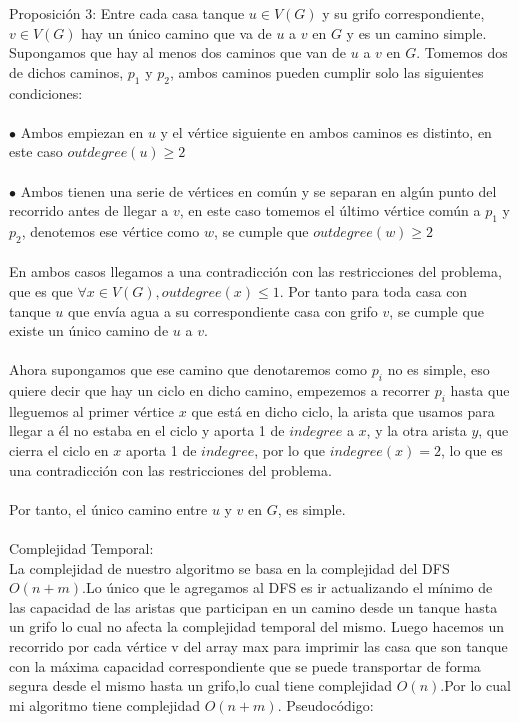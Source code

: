 \documentclass{article}
\begin{document}
    Proposici\'on 3: Entre cada casa tanque $u \in V(G)$ y su grifo correspondiente, $v \in V(G)$ hay un \'unico camino
    que va de $u$ a $v$ en $G$ y es un camino simple.\\

    Supongamos que hay al menos dos caminos que van de $u$ a $v$ en $G$. Tomemos dos de dichos caminos, $p_1$ y $p_2$, ambos caminos pueden cumplir solo las 
    siguientes condiciones:\\\\

    $\bullet$ Ambos empiezan en $u$ y el v\'ertice siguiente en ambos caminos es distinto, en este caso $outdegree(u) \geq 2$\\\\
    $\bullet$ Ambos tienen una serie de v\'ertices en com\'un y se separan en alg\'un punto del recorrido antes de llegar a $v$, 
    en este caso tomemos el \'ultimo v\'ertice com\'un a $p_1$ y $p_2$, denotemos ese v\'ertice como $w$, se cumple que $outdegree(w) \geq 2$\\\\

    En ambos casos llegamos a una contradicci\'on con las restricciones del problema, que es que $\forall x \in V(G), outdegree(x) \leq 1$. 
    Por tanto para toda casa con tanque $u$ que env\'ia agua a su correspondiente casa con grifo $v$, se cumple que existe un \'unico camino de $u$ a $v$.\\\\

    Ahora supongamos que ese camino que denotaremos como $p_i$ no es simple, eso quiere decir que hay un ciclo en dicho camino, empezemos a recorrer $p_i$ hasta 
    que lleguemos al primer v\'ertice $x$ que est\'a en dicho ciclo, la arista que usamos para llegar a \'el no estaba en el ciclo y aporta 1 de $indegree$ a $x$,
     y la otra arista $y$, que cierra el ciclo en $x$ aporta 1 de $indegree$, por lo que $indegree(x) = 2$, lo que es una contradicci\'on con las restricciones del problema.\\\\

    Por tanto, el \'unico camino entre $u$ y $v$ en $G$, es simple.
    \\\\
    Complejidad Temporal:\\
    La complejidad de nuestro algoritmo se basa en la complejidad del DFS $O(n+m)$.Lo \'unico que le agregamos al DFS
    es ir actualizando  el m\'inimo de las capacidad de las aristas que participan en un camino desde un tanque hasta un 
    grifo lo cual no afecta la complejidad temporal del mismo. Luego hacemos un recorrido por cada v\'ertice v del array max
    para imprimir las casa que son tanque con la m\'axima capacidad correspondiente que se puede transportar de forma segura 
    desde el mismo hasta un grifo,lo cual tiene complejidad $O(n)$.Por lo cual mi algoritmo tiene complejidad $O(n+m)$.
    Pseudoc\'odigo:
    
\end{document}
